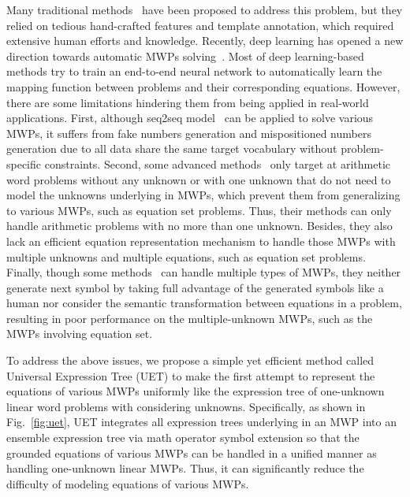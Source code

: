 \documentclass[11pt,a4paper]{article}
\begin{document}
Many traditional methods~\cite{yuhui2010frame-based,kushman2014learning,shi-etal-2015-automatically} have been proposed to address this problem, but they relied on tedious hand-crafted features and template annotation, which required extensive human efforts and knowledge.
Recently, deep learning has opened a new direction towards automatic MWPs solving~\cite{dns,cass,mathdqn,trnn,seq2tree,stackdecoder}. Most of deep learning-based methods try to train an end-to-end neural network to automatically learn the mapping function between problems and their corresponding equations. However, there are some limitations hindering them from being applied in real-world applications.  First, although seq2seq model~\cite{dns} can be applied to solve various MWPs, it suffers from fake numbers generation and mispositioned numbers generation due to all data share the same target vocabulary without problem-specific constraints. Second, some advanced methods~\cite{mathdqn,trnn,seq2tree} only target at arithmetic word problems without any unknown or with one unknown that do not need to model the unknowns underlying in MWPs, which prevent them from generalizing to various MWPs, such as equation set problems. Thus, their methods can only handle arithmetic problems with no more than one unknown. Besides, they also lack an efficient equation representation mechanism to handle those MWPs with multiple unknowns and multiple equations, such as equation set problems. Finally, though some methods~\cite{dns,cass,stackdecoder} can handle multiple types of MWPs, they neither generate next symbol by taking full advantage of the generated symbols like a human nor consider the semantic transformation between equations in a problem, resulting in poor performance on the multiple-unknown MWPs, such as the MWPs involving equation set.

To address the above issues, we propose a simple yet efficient method called Universal Expression Tree (UET) to make the first attempt to represent the equations of various MWPs uniformly like the expression tree of one-unknown linear word problems with considering unknowns. Specifically, as shown in Fig.~\ref{fig:uet}, UET integrates all expression trees underlying in an MWP into an ensemble expression tree via math operator symbol extension so that the grounded equations of various MWPs can be handled in a unified manner as handling one-unknown linear MWPs. Thus, it can significantly reduce the difficulty of modeling equations of various MWPs. 
\end{document}
